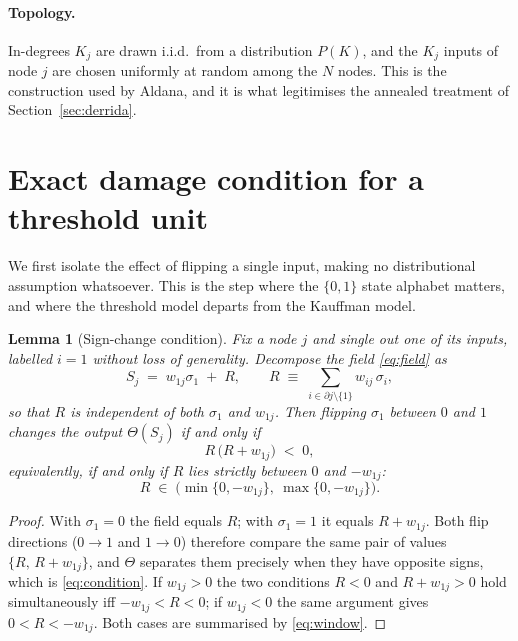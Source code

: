 \documentclass[11pt]{article}
\newtheorem{lemma}{Lemma}
\theoremstyle{remark}
\begin{document}
\paragraph{Topology.} In-degrees $K_j$ are drawn i.i.d.\ from a distribution
$P(K)$, and the $K_j$ inputs of node $j$ are chosen uniformly at random among
the $N$ nodes. This is the construction used by Aldana, and it is what
legitimises the annealed treatment of Section~\ref{sec:derrida}.

\section{Exact damage condition for a threshold unit}

We first isolate the effect of flipping a single input, making no distributional
assumption whatsoever. This is the step where the $\{0,1\}$ state alphabet
matters, and where the threshold model departs from the Kauffman model.

\begin{lemma}[Sign-change condition]
\label{lem:flip}
Fix a node $j$ and single out one of its inputs, labelled $i=1$ without loss of
generality. Decompose the field \eqref{eq:field} as
\begin{equation}
  S_j \;=\; w_{1j}\sigma_1 \;+\; R,
  \qquad
  R \;\equiv\; \sum_{i\in\partial j\setminus\{1\}} w_{ij}\,\sigma_i ,
  \label{eq:split}
\end{equation}
so that $R$ is independent of both $\sigma_1$ and $w_{1j}$. Then flipping
$\sigma_1$ between $0$ and $1$ changes the output $\Theta(S_j)$ if and only if
\begin{equation}
  R\,\big(R+w_{1j}\big) \;<\; 0,
  \label{eq:condition}
\end{equation}
equivalently, if and only if $R$ lies strictly between $0$ and $-w_{1j}$:
\begin{equation}
  R \;\in\; \Big(\min\{0,-w_{1j}\},\ \max\{0,-w_{1j}\}\Big).
  \label{eq:window}
\end{equation}
\end{lemma}

\begin{proof}
With $\sigma_1=0$ the field equals $R$; with $\sigma_1=1$ it equals $R+w_{1j}$.
Both flip directions ($0\to1$ and $1\to0$) therefore compare the same pair of
values $\{R,\,R+w_{1j}\}$, and $\Theta$ separates them precisely when they have
opposite signs, which is \eqref{eq:condition}. If $w_{1j}>0$ the two conditions
$R<0$ and $R+w_{1j}>0$ hold simultaneously iff $-w_{1j}<R<0$; if $w_{1j}<0$ the
same argument gives $0<R<-w_{1j}$. Both cases are summarised by
\eqref{eq:window}.
\end{proof}
\end{document}
